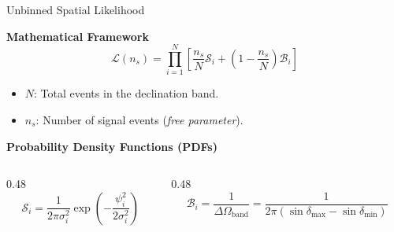 \begin{frame}{Unbinned Spatial Likelihood}

    \textbf{Mathematical Framework}
    \begin{equation*}
        \mathcal{L}(n_s) = \prod_{i=1}^{N} \left[ \frac{n_s}{N} \mathcal{S}_i + \left(1 - \frac{n_s}{N}\right) \mathcal{B}_i \right]
    \end{equation*}
    \vspace{-0.3cm}
    \begin{itemize}
        \item $N$: Total events in the declination band.
        \item $n_s$: Number of signal events (\textit{free parameter}).
    \end{itemize}

    \vspace{0.3cm}

    \textbf{Probability Density Functions (PDFs)}
    \vspace{0.2cm}
    \begin{columns}[t]
        
        \begin{column}{0.48\textwidth}
            \begin{equation*}
                \mathcal{S}_i = \frac{1}{2\pi\sigma_i^2} \exp\left(-\frac{\psi_i^2}{2\sigma_i^2}\right)
            \end{equation*}
        \end{column}
        
        \begin{column}{0.48\textwidth}
            \begin{equation*}
                \mathcal{B}_i = \frac{1}{\Delta \Omega_{\text{band}}} = \frac{1}{2\pi (\sin \delta_{\text{max}} - \sin \delta_{\text{min}})}
            \end{equation*}
        \end{column}
        
    \end{columns}
\end{frame}

